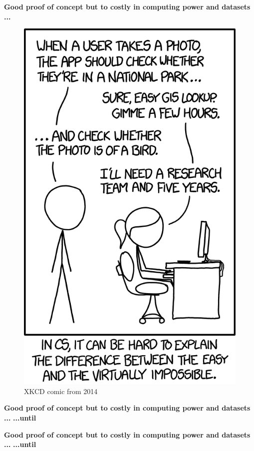 \documentclass{irdbeamer}
\begin{document}
\begin{frame}[t]{}
\textbf{\large Good proof of concept but to costly in computing power and datasets ... }
    \begin{figure}
        \centering
        \includegraphics[width=.2\linewidth]{figs/xkcd_photo_is_a_bird.png}
        \caption{\tiny XKCD comic from 2014}
    \end{figure}
\end{frame}
\begin{frame}[t]{}
\textbf{\large Good proof of concept but to costly in computing power and datasets ... }
\textbf{\large  ...until}

\end{frame}
\begin{frame}[t]{}
\textbf{\large Good proof of concept but to costly in computing power and datasets ... }
\textbf{\large  ...until}
\begin{center}
\end{center}
\end{frame}
\end{document}
